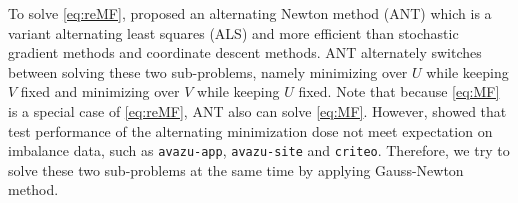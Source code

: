 \documentclass[11pt,twoside]{article}
\begin{document}
To solve \eqref{eq:reMF}, \citet{test17a} proposed an alternating Newton method (ANT) which is a variant alternating least squares (ALS) and more efficient than stochastic gradient methods and coordinate descent methods. ANT alternately switches between solving these two sub-problems, namely minimizing over $U$ while keeping $V$ fixed and minimizing over $V$ while keeping $U$ fixed. Note that because \eqref{eq:MF} is a special case of \eqref{eq:reMF}, ANT also can solve \eqref{eq:MF}.
However, \citet{test17a} showed that test performance of the alternating minimization dose not meet expectation on imbalance data, such as {\tt avazu-app}, {\tt avazu-site} and {\tt criteo}. Therefore, we try to solve these two sub-problems at the same time by applying Gauss-Newton method.
\end{document}

